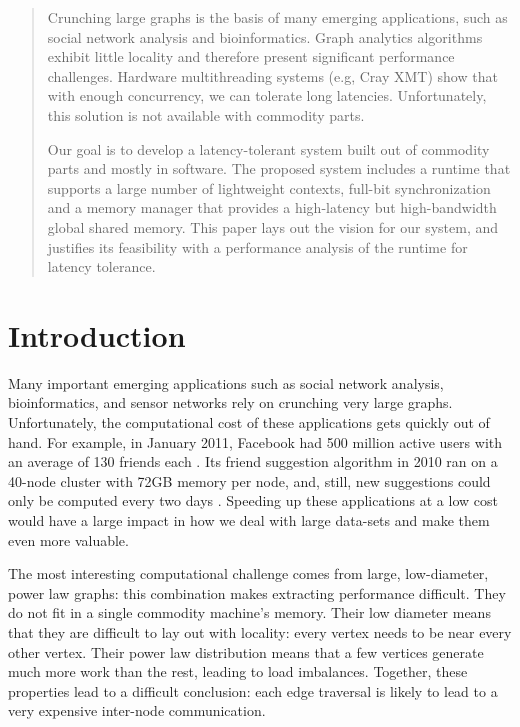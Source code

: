 \documentclass[10pt,nocopyrightspace,preprint]{sigplanconf}
\begin{document}
\begin{abstract}
   Crunching large graphs is the basis of many emerging applications,
   such as social network analysis and bioinformatics. Graph analytics
   algorithms exhibit little locality and therefore present significant
   performance challenges. Hardware multithreading systems (e.g, Cray
   XMT) show that with enough concurrency, we can tolerate long
   latencies. Unfortunately, this solution is not available with
   commodity parts.
 
   Our goal is to develop a latency-tolerant system built out of
   commodity parts and mostly in software. The proposed system includes
   a runtime that supports a large number of lightweight contexts,
   full-bit synchronization and a memory manager that provides a
   high-latency but high-bandwidth global shared memory. This paper
   lays out the vision for our system, and justifies its feasibility
   with a performance analysis of the runtime for latency tolerance.
 
\end{abstract}

\section{Introduction}

Many important emerging applications such as social network analysis,
bioinformatics, and sensor networks rely on crunching very large
graphs. Unfortunately, the computational cost of these applications
gets quickly out of hand. For example, in January 2011, Facebook had
500 million active users with an average of 130 friends each
\cite{Facebook:2011p91}. Its friend suggestion algorithm in 2010 ran on
  a 40-node cluster with 72GB memory per node, and, still, new
  suggestions could only be computed every two days
  \cite{Backstrom:2010p90}. Speeding up these applications at a low
  cost would have a large impact in how we deal with large data-sets and make them even more valuable.



The most interesting computational challenge comes from large,
low-diameter, power law graphs: this combination makes extracting
performance difficult. They do not fit in a single
commodity machine's memory. Their low diameter means that they are
difficult to lay out with locality: every vertex needs to be near every
other vertex. Their power law distribution means that a few vertices
generate much more work than the rest, leading to load
imbalances. Together, these properties  lead to a
difficult conclusion: each edge traversal is likely to lead to a very
expensive inter-node communication.
\end{document}
